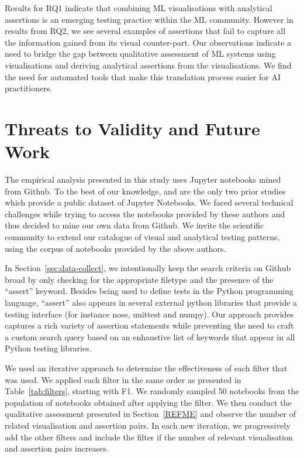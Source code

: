 \documentclass[conference]{IEEEtran}
\begin{document}
Results for RQ1 indicate that combining ML visualisations with analytical assertions is an emerging testing practice within the ML community. However in results from RQ2, we see several examples of assertions that fail to capture all the information gained from its visual counter-part. Our observations indicate a need to bridge the gap between qualitative assessment of ML systems using visualisations and deriving analytical assertions from the visualisations. We find the need for automated tools that make this translation process easier for AI practitioners.

\section{Threats to Validity and Future Work}\label{sec:threats}

The empirical analysis presented in this study uses Jupyter notebooks mined from Github. To the best of our knowledge, \cite{pimentel2019large} and \cite{quaranta2021kgtorrent} are the only two prior studies which provide a public dataset of Jupyter Notebooks. We faced several technical challenges while trying to access the notebooks provided by these authors and thus decided to mine our own data from Github. We invite the scientific community to extend our catalogue of visual and analytical testing patterns, using the corpus of notebooks provided by the above authors.

In Section~\ref{sec:data-collect}, we intentionally keep the search criteria on Github broad by only checking for the appropriate filetype and the presence of the ``assert'' keyword. Besides being used to define tests in the Python programming language, ``assert'' also appears in several external python libraries that provide a testing interface (for instance nose, unittest and numpy). Our approach provides captures a rich variety of assertion statements while preventing the need to craft a custom search query based on an enhaustive list of keywords that appear in all Python testing libraries.

We used an iterative approach to determine the effectiveness of each filter that was used. We applied each filter in the same order as presented in Table~\ref{tab:filters}, starting with F1. We randomly sampled 50 notebooks from the population of notebooks obtained after applying the filter. We then conduct the qualitative assessment presented in Section~\ref{REFME} and observe the number of related visualisation and assertion pairs. In each new iteration, we progressively add the other filters and include the filter if the number of relevant visualisation and assertion pairs increases.
\end{document}
